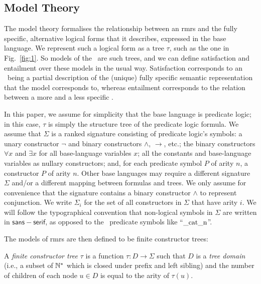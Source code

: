 


\subsection{Model Theory}

The model theory formalises the relationship between an {\sc rmrs} and
the fully specific, alternative logical forms that it describes,
expressed in the base language.  We represent such a logical form as a
tree $\tau$, such as the one in Fig.~\ref{fig:1}.  So models of the
\rmrs\ are such trees, and we can define satisfaction and entailment
over these models in the usual way.  Satisfaction corresponds to an
\rmrs\ being a partial description of the (unique) fully specific
semantic representation that the model corresponds to, whereas
entailment corresponds to the relation between a more and a less
specific \rmrs.

In this paper, we assume for simplicity that the base language is
predicate logic; in this case, $\tau$ is simply the structure tree of
the predicate logic formula.  We assume that $\Sigma$ is a ranked
signature consisting of predicate logic's symbols: a unary constructor
$\neg$ and binary constructors $\wedge$, $\rightarrow$, etc.; the
binary constructors $\forall x$ and $\exists x$ for all base-language
variables $x$; all the constants and base-language variables as
nullary constructors; and, for each predicate symbol $P$ of arity $n$,
a constructor $P$ of arity $n$.  Other base languages may require a
different signature $\Sigma$ and/or a different mapping between
formulas and trees.  We only assume for convenience that the signature
contains a binary constructor $\wedge$ to represent conjunction.  We
write $\Sigma_i$ for the set of all constructors in $\Sigma$ that have
arity $i$.  We will follow the typographical convention that
non-logical symbols in $\Sigma$ are written in
$\mathsf{sans{-}serif}$, as opposed to the \rmrs\ predicate symbols
like ``$\mathrm{\_cat\_n}$''.

The models of {\sc rmrs} are then defined to be finite constructor
trees:
\begin{definition}\label{defn:models}
  A {\em finite constructor tree} $\tau$ is a function $\tau:D
  \rightarrow \Sigma$ such that $D$ is a \emph{tree domain} (i.e., a
  subset of $\mathbb{N}^*$ which is closed under prefix and left sibling) and
  the number of children of each node $u \in D$ is equal to the arity
  of $\tau(u)$.  
\end{definition}


